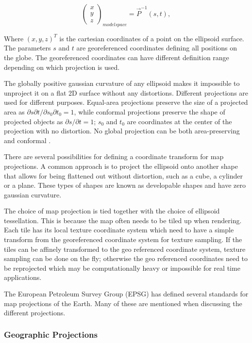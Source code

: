 \begin{equation}
\label{eq:invproj}
\begin{pmatrix} x \\ y \\ z \end{pmatrix}_{ modelspace }=\vec { P }^{-1} (s ,t ),
\end{equation}

Where $(x,y,z)^T$ is the cartesian coordinates of a point on the ellipsoid surface. The parameters $s$ and $t$ are georeferenced coordinates defining all positions on the globe. The georeferenced coordinates can have different definition range depending on which projection is used.

The globally positive gaussian curvature of any ellipsoid makes it impossible to unproject it on a flat 2D surface without any distortions. Different projections are used for different purposes. Equal-area projections preserve the size of a projected area as $\partial s \partial t / \partial s_0 \partial t_0 = 1$, while conformal projections preserve the shape of projected objects as $\partial s / \partial t = 1$; $s_0$ and $t_0$ are coordinates at the center of the projection with no distortion. No global projection can be both area-preserving and conformal \cite{dimi15}.

There are several possibilities for defining a coordinate transform for map projections. A common approach is to project the ellipsoid onto another shape that allows for being flattened out without distortion, such as a cube, a cylinder or a plane. These types of shapes are known as developable shapes and have zero gaussian curvature.

The choice of map projection is tied together with the choice of ellipsoid tessellation. This is because the map often needs to be tiled up when rendering. Each tile has its local texture coordinate system which need to have a simple transform from the georeferenced coordinate system for texture sampling. If the tiles can be affinely transformed to the geo referenced coordinate system, texture sampling can be done on the fly; otherwise the geo referenced coordinates need to be reprojected which may be computationally heavy or impossible for real time applications.

The European Petroleum Survey Group (EPSG) has defined several standards for map projections of the Earth. Many of these are mentioned when discussing the different projections.

\subsubsection{Geographic Projections}


